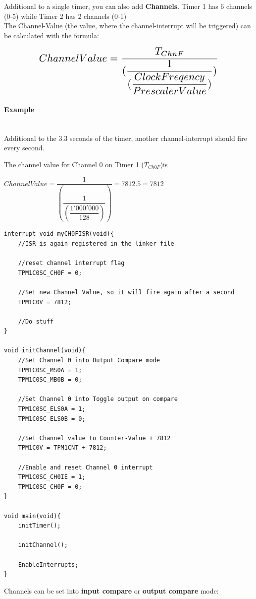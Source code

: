 \documentclass[a4paper, 11pt, nofootinbib]{article}
\begin{document}
Additional to a single timer, you can also add \textbf{Channels}. Timer 1 has 6 channels (0-5) while Timer 2 has 2 channels (0-1) \\
The Channel-Value (the value, where the channel-interrupt will be triggered) can be calculated with the formula:

\[ \scalebox{1.5}{$Channel Value = \dfrac{T_{ChnF}}{(\dfrac{1}{(\dfrac{ClockFreqency}{PrescalerValue})})}$} \]

\paragraph{Example}\mbox{}\\
Additional to the 3.3 seconds of the timer, another channel-interrupt should fire every second.

The channel value for Channel 0 on Timer 1 ($T_{Ch0F}$)is \\

\begin{center}
$
Channel Value = \dfrac{1}{(\dfrac{1}{(\dfrac{1'000'000}{128})})} = 7812.5 = 7812
$
\end{center}
\newpage

\begin{lstlisting}
interrupt void myCH0FISR(void){
	//ISR is again registered in the linker file
	
	//reset channel interrupt flag
	TPM1C0SC_CH0F = 0;
	
	//Set new Channel Value, so it will fire again after a second
	TPM1C0V = 7812;
	
	//Do stuff
}

void initChannel(void){
	//Set Channel 0 into Output Compare mode
	TPM1C0SC_MS0A = 1;
	TPM1C0SC_MB0B = 0;
	
	//Set Channel 0 into Toggle output on compare
	TPM1C0SC_ELS0A = 1;
	TPM1C0SC_ELS0B = 0;
	
	//Set Channel value to Counter-Value + 7812
	TPM1C0V = TPM1CNT + 7812;
	
	//Enable and reset Channel 0 interrupt
	TPM1C0SC_CH0IE = 1;
	TPM1C0SC_CH0F = 0;
}

void main(void){
	initTimer();
	
	initChannel();
	
	EnableInterrupts;
}
\end{lstlisting}

\noindent Channels can be set into \textbf{input compare} or \textbf{output compare} mode:
\end{document}
